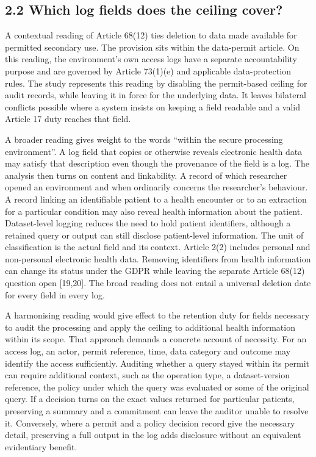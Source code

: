 \documentclass[preprint,review,12pt]{elsarticle}
\begin{document}
\hypertarget{which-log-fields-does-the-ceiling-cover}{%
\subsection{2.2 Which log fields does the ceiling
cover?}\label{which-log-fields-does-the-ceiling-cover}}

A contextual reading of Article 68(12) ties deletion to data made
available for permitted secondary use. The provision sits within the
data-permit article. On this reading, the environment's own access logs
have a separate accountability purpose and are governed by Article
73(1)(e) and applicable data-protection rules. The study represents this
reading by disabling the permit-based ceiling for audit records, while
leaving it in force for the underlying data. It leaves bilateral
conflicts possible where a system insists on keeping a field readable
and a valid Article 17 duty reaches that field.

A broader reading gives weight to the words ``within the secure
processing environment''. A log field that copies or otherwise reveals
electronic health data may satisfy that description even though the
provenance of the field is a log. The analysis then turns on content and
linkability. A record of which researcher opened an environment and when
ordinarily concerns the researcher's behaviour. A record linking an
identifiable patient to a health encounter or to an extraction for a
particular condition may also reveal health information about the
patient. Dataset-level logging reduces the need to hold patient
identifiers, although a retained query or output can still disclose
patient-level information. The unit of classification is the actual
field and its context. Article 2(2) includes personal and non-personal
electronic health data. Removing identifiers from health information can
change its status under the GDPR while leaving the separate Article
68(12) question open {[}19,20{]}. The broad reading does not entail a
universal deletion date for every field in every log.

A harmonising reading would give effect to the retention duty for fields
necessary to audit the processing and apply the ceiling to additional
health information within its scope. That approach demands a concrete
account of necessity. For an access log, an actor, permit reference,
time, data category and outcome may identify the access sufficiently.
Auditing whether a query stayed within its permit can require additional
context, such as the operation type, a dataset-version reference, the
policy under which the query was evaluated or some of the original
query. If a decision turns on the exact values returned for particular
patients, preserving a summary and a commitment can leave the auditor
unable to resolve it. Conversely, where a permit and a policy decision
record give the necessary detail, preserving a full output in the log
adds disclosure without an equivalent evidentiary benefit.
\end{document}
